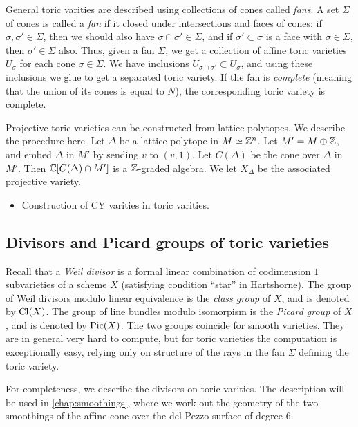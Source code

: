 General toric varities are described using collections of cones called \emph{fans}. A set $\Sigma$ of cones is called a \emph{fan} if it closed under intersections and faces of cones: if $\sigma, \sigma' \in \Sigma$, then we should also have $\sigma \cap \sigma' \in \Sigma$, and if $\sigma' \subset \sigma$ is a face with $\sigma \in \Sigma$, then $\sigma' \in \Sigma$ also. Thus, given a fan $\Sigma$, we get a collection of affine toric varieties $U_\sigma$ for each cone $\sigma \in \Sigma$. We have inclusions $U_{\sigma \cap \sigma'} \subset U_\sigma$, and using these inclusions we glue to get a separated toric variety. If the fan is \emph{complete} (meaning that the union of its cones is equal to $N$), the corresponding toric variety is complete. 

\begin{example}
\end{example}

Projective toric varieties can be constructed from lattice polytopes. We describe the procedure here. Let $\Delta$ be a lattice polytope in $M \simeq \mathbb{Z}^n$. Let $M' = M \oplus \mathbb{Z}$, and embed $\Delta$ in $M'$ by sending $v$ to $(v,1)$. Let $C(\Delta)$ be the cone over $\Delta$ in $M'$. Then $\mathbb{C}[C(\Delta) \cap M']$ is a $\mathbb{Z}$-graded algebra. We let $X_\Delta$ be the associated projective variety. 

\begin{itemize}
	\item Construction of CY varities in toric varities.
\end{itemize}

\subsection{Divisors and Picard groups of toric varieties}

Recall that a \emph{Weil divisor} is a formal linear combination of codimension $1$ subvarieties of a scheme $X$ (satisfying condition ``star'' in Hartshorne). The group of Weil divisors modulo linear equivalence is the \emph{class group} of $X$, and is denoted by $\operatorname{Cl}(X)$. The group of line bundles modulo isomorpism is the \emph{Picard group} of $X$, and is denoted by $\operatorname{Pic}(X)$. The two groups coincide for smooth varieties. They are in general very hard to compute, but for toric varieties the computation is exceptionally easy, relying only on structure of the rays in the fan $\Sigma$ defining the toric variety.

For completeness, we describe the divisors on toric varities. The description will be used in \cref{chap:smoothings}, where we work out the geometry of the two smoothings of the affine cone over the del Pezzo surface of degree $6$.

